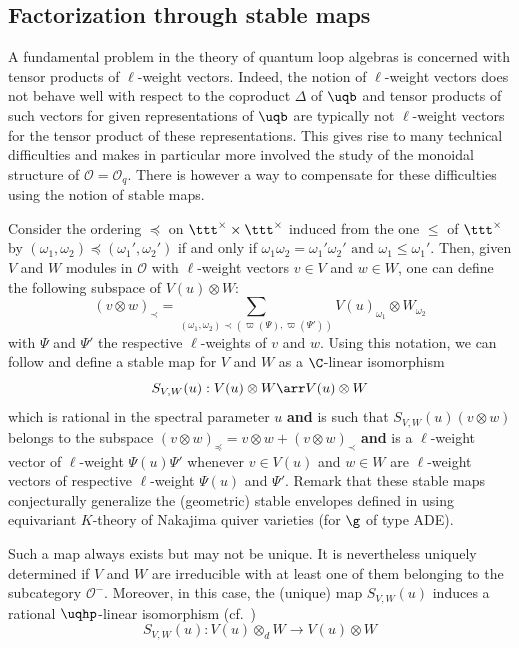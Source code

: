 \documentclass[11pt]{amsart}
\theoremstyle{definition}
\theoremstyle{remark}
\numberwithin{equation}{section}
\begin{document}
\subsection{Factorization through stable maps}\label{sec:Stab} A fundamental problem in the theory of quantum loop algebras is concerned with tensor products of $\ell$-weight vectors. Indeed, the notion of $\ell$-weight vectors does not behave well with respect to the coproduct $\Delta$ of $\uqb$ and tensor products of such vectors for given representations of $\uqb$ are typically not $\ell$-weight vectors for the tensor product of these representations. This gives rise to many technical difficulties and makes in particular more involved the study of the monoidal structure of $\mathcal{O}=\mathcal{O}_q$. There is however a way to compensate for these difficulties using the notion of stable maps. \par
Consider the ordering $\preceq$ on $\ttt^{\times}\times\ttt^{\times}$ induced from the one $\leq$ of $\ttt^{\times}$ by $(\omega_1,\omega_2)\preceq (\omega_1',\omega_2')$ if and only if $\omega_1\omega_2 = \omega_1'\omega_2'\text{ and } \omega_1\leq \omega_1'$. Then, given $V$ and $W$ modules in $\mathcal{O}$ with $\ell$-weight vectors $v\in V$ and $w \in W$, one can define the following subspace of $V(u)\otimes W$:
$$ (v\otimes w)_{\prec} = \sum_{(\omega_1,\omega_2)\prec (\varpi(\Psi),\varpi(\Psi'))} V(u)_{\omega_1}\otimes W_{\omega_2}$$
with $\Psi$ and $\Psi'$ the respective $\ell$-weights of $v$ and $w$. Using this notation, we can follow \cite{her} and define a stable map for $V$ and $W$ as a $\C$-linear isomorphism 
$$S_{V,W}(u):V(u)\otimes W \arr V(u)\otimes W$$
which is rational in the spectral parameter $u$ \textbf{and} is such that $S_{V,W}(u)(v\otimes w)$ belongs to the subspace $(v\otimes w)_{\preceq}=v\otimes w+(v\otimes w)_{\prec}$ \textbf{and} is a $\ell$-weight vector of $\ell$-weight $\Psi(u)\Psi'$ whenever $v\in V(u)$ and $w\in W$ are $\ell$-weight vectors of respective $\ell$-weight $\Psi(u)$ and $\Psi'$. Remark that these stable maps conjecturally generalize the (geometric) stable envelopes defined in \cite{mo} using equivariant $K$-theory of Nakajima quiver varieties (for $\g$ of type ADE). \par 
Such a map always exists but may not be unique. It is nevertheless uniquely determined if $V$ and $W$ are irreducible with at least one of them belonging to the subcategory $\mathcal{O}^-$. Moreover, in this case, the (unique) map $S_{V,W}(u)$ induces a rational $\uqhp$-linear isomorphism (cf.~\cite{her}) $$ S_{V,W}(u):V(u)\otimes_d W \rightarrow V(u)\otimes W$$
\end{document}
